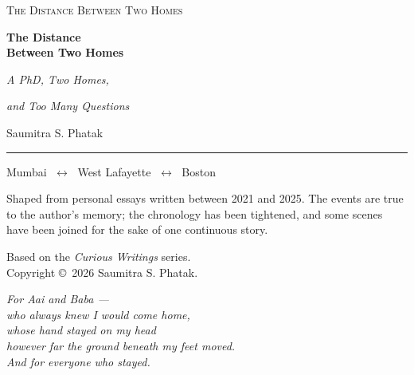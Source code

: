 \documentclass[11pt,twoside,openany]{book}
\begin{document}
\frontmatter

\thispagestyle{empty}
\vspace*{2.6in}
\begin{center}{\sffamily\scshape\large The Distance Between Two Homes}\end{center}
\clearpage

\thispagestyle{empty}
\begin{center}
  \vspace*{1.0in}
  {\sffamily\bfseries\fontsize{27}{31}\selectfont The Distance\\[3pt] Between Two Homes\par}
  \vspace{0.35in}
  {\large\itshape A PhD, Two Homes,\par}
  {\large\itshape and Too Many Questions\par}
  \vfill
  {\Large Saumitra S. Phatak\par}
  \vspace{0.55in}
  {\color{accent}\rule{1.3in}{0.8pt}\par}
  \vspace{0.22in}
  {\small Mumbai \(\;\longleftrightarrow\;\) West Lafayette \(\;\longleftrightarrow\;\) Boston\par}
\end{center}
\clearpage

\thispagestyle{empty}
\vspace*{\fill}
\begin{center}\begin{minipage}{0.8\textwidth}\small
Shaped from personal essays written between 2021 and 2025. The events are true
to the author's memory; the chronology has been tightened, and some scenes have
been joined for the sake of one continuous story.\par
\vspace{1em}
Based on the \textit{Curious Writings} series.\\
Copyright \copyright\ 2026 Saumitra S. Phatak.
\end{minipage}\end{center}
\clearpage

\thispagestyle{empty}
\vspace*{\fill}
\begin{center}\itshape
For Aai and Baba ---\\[0.4em]
who always knew I would come home,\\
whose hand stayed on my head\\
however far the ground beneath my feet moved.\\[1em]
And for everyone who stayed.
\end{center}
\vspace*{\fill}
\clearpage
\end{document}

